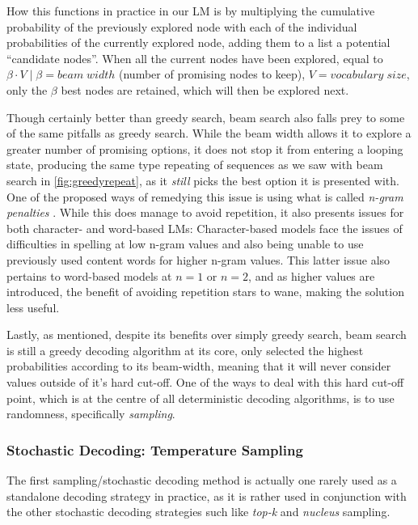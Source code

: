 How this functions in practice in our LM is by multiplying the cumulative probability of the previously explored node with each of the individual probabilities of the currently explored node, adding them to a list a potential “candidate nodes”. When all the current nodes have been explored, equal to $\beta \cdot V \mid \beta = beam\;width$ (number of promising nodes to keep), $V = vocabulary\;size$, only the $\beta$ best nodes are retained, which will then be explored next.

Though certainly better than greedy search, beam search also falls prey to some of the same pitfalls as greedy search. While the beam width allows it to explore a greater number of promising options, it does not stop it from entering a looping state, producing the same type repeating of sequences as we saw with beam search in \cref{fig:greedyrepeat}, as it \textit{still} picks the best option it is presented with. One of the proposed ways of remedying this issue is using what is called \textit{n-gram penalties} \cite{PaulusRomain2017ADRM} \cite{Klein2017OpenNMT}. While this does manage to avoid repetition, it also presents issues for both character- and word-based LMs: Character-based models face the issues of difficulties in spelling at low n-gram values and also being unable to use previously used content words for higher n-gram values. This latter issue also pertains to word-based models at $n = 1$ or $n = 2$, and as higher values are introduced, the benefit of avoiding repetition stars to wane, making the solution less useful.

Lastly, as mentioned, despite its benefits over simply greedy search, beam search is still a greedy decoding algorithm at its core, only selected the highest probabilities according to its beam-width, meaning that it will never consider values outside of it’s hard cut-off. One of the ways to deal with this hard cut-off point, which is at the centre of all deterministic decoding algorithms, is to use randomness, specifically \textit{sampling}.

\subsubsection{Stochastic Decoding: Temperature Sampling}
\label{sec:sto-temp}

The first sampling/stochastic decoding method is actually one rarely used as a standalone decoding strategy in practice, as it is rather used in conjunction with the other stochastic decoding strategies such like \textit{top-k} and \textit{nucleus} sampling.

